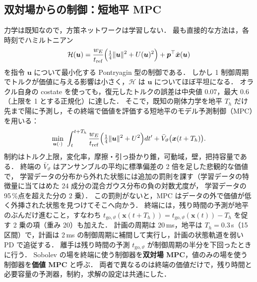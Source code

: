 \subsection{双対場からの制御：短地平 MPC}
\label{sec:mpc}
力学は既知なので，方策ネットワークは学習しない．
最も直接的な方法は，各時刻でハミルトニアン
\begin{equation}
\mathcal H(\bm u)=\frac{w_E}{t_{\mathrm{ref}}}\Bigl(\tfrac14\|\bm u\|^2+U(\bm u)^2\Bigr)+\bm p^\top\dot{\bm x}(\bm u)
\end{equation}
を指令 $\bm u$ について最小化する Pontryagin 型の制御である．
しかし 1 制御周期でトルクが価値に与える影響は小さく，$\mathcal H$ は $\bm u$ についてほぼ平坦になる．
オラクル自身の costate を使っても，復元したトルクの誤差は中央値 0.07，最大 0.6（上限を 1 とする正規化）に達した．
そこで，既知の剛体力学を地平 $T_h$ だけ先まで陽に予測し，その終端で価値を評価する短地平のモデル予測制御（MPC）を用いる：
\begin{equation}
\min_{\bm u(\cdot)}\ \int_{t}^{t+T_h}\frac{w_E}{t_{\mathrm{ref}}}\Bigl(\tfrac14\|\bm u\|^2+U^2\Bigr)dt'+\bar V_\vartheta\bigl(\bm x(t+T_h)\bigr).
\label{eq:mpc}
\end{equation}
制約はトルク上限，変化率，摩擦・引っ掛かり錐，可動域，壁，把持容量である．
終端の $\bar V_\vartheta$ はアンサンブルの平均に標準偏差の 2 倍を足した悲観的な価値で，
学習データの分布から外れた状態には追加の罰則を課す（学習データの特徴量に当てはめた 24 成分の混合ガウス分布の負の対数尤度が，
学習データの 95\,\%点を超えた分の 2 乗）．
この罰則がないと，MPC はデータの外で価値が低く外挿された状態を見つけてそこへ向かう．
終端には，残り時間の予測が地平のぶんだけ進むこと，すなわち $t_{\mathrm{go},\vartheta}(\bm x(t+T_h))=t_{\mathrm{go},\vartheta}(\bm x(t))-T_h$ を促す 2 乗の項（重み 20）も加えた．
計画の周期は 20\,ms，地平は $T_h=0.3$\,s（15 区間）で，計画は 2\,ms の制御周期に補間して実行し，計画の状態軌道を弱い PD で追従する．
離手は残り時間の予測 $t_{\mathrm{go},\vartheta}$ が制御周期の半分を下回ったときに行う．
Sobolev の場を終端に使う制御器を\textbf{双対場 MPC}，値のみの場を使う制御器を\textbf{価値 MPC} と呼ぶ．
両者で異なるのは終端の価値だけで，残り時間と必要容量の予測器，制約，求解の設定は共通にした．
